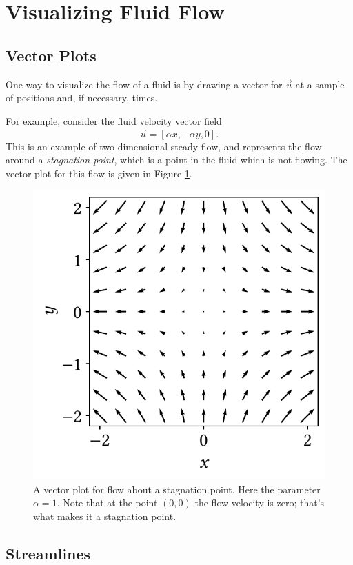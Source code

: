 %
%
%

\section{Visualizing Fluid Flow}

%
%

\subsection{Vector Plots}

One way to visualize the flow of a fluid is by drawing a vector for $\vec{u}$ at a sample of positions and, if necessary, times.

\begin{example}
\label{ex_stag_point1}
For example, consider the fluid velocity vector field
\begin{equation}
\label{eq_stag}
\vec{u} = [\alpha x, -\alpha y, 0].
\end{equation}
This is an example of two-dimensional steady flow, and represents the flow around a \emph{stagnation point}, which is a point in the fluid which is not flowing.  The vector plot for this flow is given in Figure \ref{fig_vector_plot}. 
\end{example}

\begin{figure}
\centering\includegraphics[width=0.5\linewidth]{Figures/Chapter1/fig_vector_plot}
\caption{A vector plot for flow about a stagnation point.  Here the parameter $\alpha = 1$.  Note that at the point $(0,0)$ the flow velocity is zero; that's what makes it a stagnation point. }
\label{fig_vector_plot}
\end{figure}



\subsection{Streamlines}

